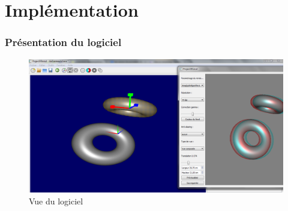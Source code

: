 \documentclass{beamer}
\begin{document}

%


%


\section{Implémentation}

\begin{frame}
\frametitle{Présentation du logiciel}
\begin{figure}
\includegraphics[scale=0.22]{logiciel.png}
\caption{Vue du logiciel}
\end{figure}
\end{frame}
\end{document}
